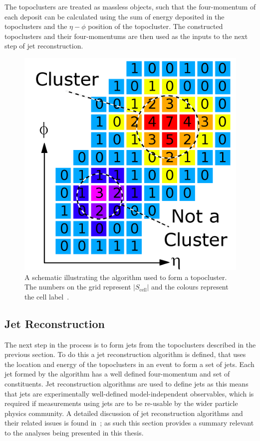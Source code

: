 The topoclusters are treated as massless objects,
such that the four-momentum of each deposit can be calculated using the sum of energy deposited in the topoclusters
and the $\eta-\phi$ position of the topocluster.
The constructed topoclusters and their four-momentums are then used as the inputs to the next step of jet reconstruction.

\begin{figure}[!hbt]
  \begin{center}
    \includegraphics[width=0.7\linewidth, angle=0]{figs/Objects/topo_schem.png}
  \end{center}
  \caption[A schematic illustrating the algorithm used to form a topocluster. The numbers on the grid represent $|S_{\text{cell}}|$ and the colours represent the cell label.]
          {A schematic illustrating the algorithm used to form a topocluster. The numbers on the grid represent $|S_{\text{cell}}|$ and the colours represent the cell label~\cite{det-magnet_fig}.}
  \label{fig:obj-topo_schem}
\end{figure}

\FloatBarrier
\subsection{Jet Reconstruction}
\label{sec:obj-jets_reco}

The next step in the process is to form jets from the topoclusters described in the previous section.
To do this a jet reconstruction algorithm is defined,
that uses the location and energy of the topoclusters in an event to form a set of jets.
Each jet formed by the algorithm has a well defined four-momentum and set of constituents.
Jet reconstruction algorithms are used to define jets as this means that jets are experimentally well-defined model-independent observables,
which is required if measurements using jets are to be re-usable by the wider particle physics community.
A detailed discussion of jet reconstruction algorithms
and their related issues is found in~\cite{obj-jets_reco_salam};
as such this section provides a summary relevant to the analyses being presented in this thesis.

